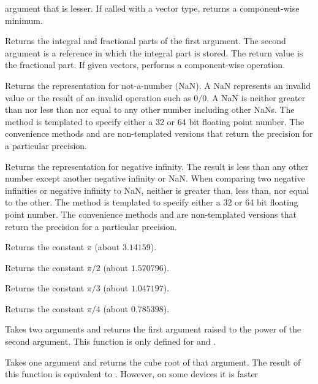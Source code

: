 \begin{description}
  argument that is lesser. If called with a vector type, returns a
  component-wise minimum.
\item[\vtkm{ModF}] Returns the integral and fractional parts of the
  first argument. The second argument is a reference in which the integral
  part is stored. The return value is the fractional part. If given
  vectors,  performs a component-wise operation.
\item[\vtkm{Nan}]  Returns the representation for
  not-a-number (NaN). A NaN represents an invalid value or the result of an
  invalid operation such as $0/0$. A NaN is neither greater than nor less
  than nor equal to any other number including other NaNs. The
   method is templated to specify either a 32 or 64 bit
  floating point number. The convenience methods  and
   are non-templated versions that return the
  precision for a particular precision.
\item[\vtkm{NegativeInfinity}] Returns the representation for negative
  infinity. The result is less than any other number except another
  negative infinity or NaN. When comparing two negative infinities or
  negative infinity to NaN, neither is greater than, less than, nor equal
  to the other. The  method is templated
  to specify either a 32 or 64 bit floating point number. The convenience
  methods  and
   are non-templated versions that
  return the precision for a particular precision.
\item[\vtkm{Pi}] \index{$\pi$} Returns the constant $\pi$ (about
  $3.14159$).
\item[\vtkm{Pi\_2}] \index{$\pi$} Returns the constant $\pi/2$ (about
  $1.570796$).
\item[\vtkm{Pi\_3}] \index{$\pi$} Returns the constant $\pi/3$ (about
  $1.047197$).
\item[\vtkm{Pi\_4}] \index{$\pi$} Returns the constant $\pi/4$ (about
  $0.785398$).
\item[\vtkm{Pow}]  Takes two arguments and returns the
  first argument raised to the power of the second argument. This function
  is only defined for  and .
\item[\vtkm{RCbrt}]  Takes one argument and
  returns the cube root of that argument. The result of this function is
  equivalent to . However, on some devices it is faster

\end{description}
